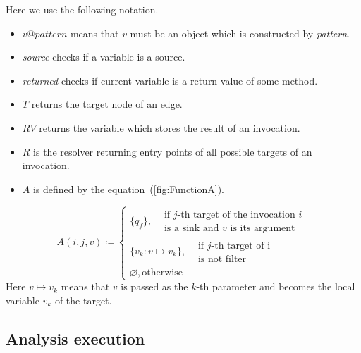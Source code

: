 Here we use the following notation.
\begin{itemize}
 \item $v@\textit{pattern}$ means that $v$ must be an object which is constructed by \textit{pattern}.
 \item \textit{source} checks if a variable is a source.
 \item \textit{returned} checks if current variable is a return value of some method.
 \item $T$ returns the target node of an edge.
 \item $RV$ returns the variable which stores the result of an invocation.
 \item $R$ is the resolver returning entry points of all possible targets of an invocation.
 \item $A$ is defined by the equation~(\ref{fig:FunctionA}).
\end{itemize}

\begin{equation}
    \label{fig:FunctionA}
    A(i, j, v) \coloneqq
    \begin{cases}
        \{q_f\},  \begin{split}&\textrm{if $j$-th target of the invocation $i$} \\ & \textrm{is a sink and $v$ is its argument}\end{split} \\
            \{v_k: v \mapsto v_k\}, \begin{split}&\textrm{if $j$-th target of i} \\ & \textrm{is not filter}\end{split} \\
        \varnothing, \textrm{otherwise}
    \end{cases}
\end{equation}
Here $v \mapsto v_k$ means that $v$ is passed as the $k$-th parameter and becomes the local variable $v_k$ of the target.

\subsection{Analysis execution}

